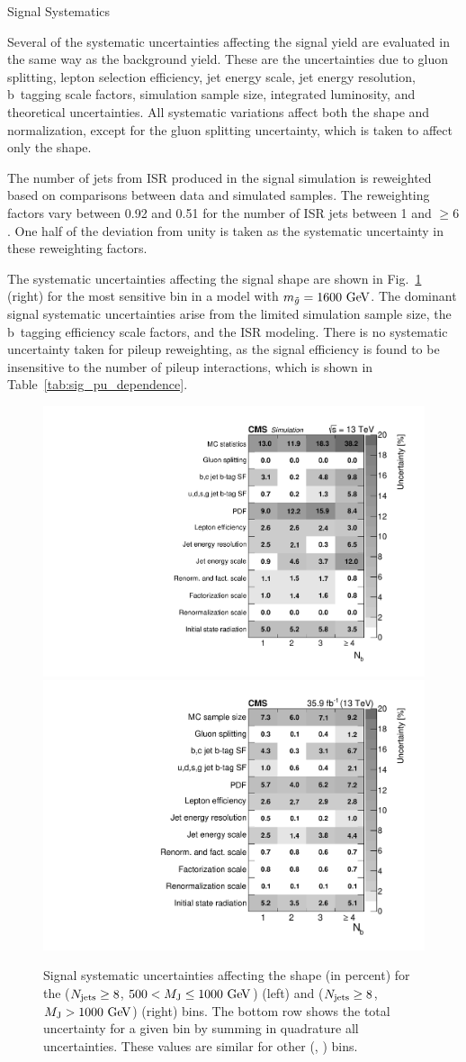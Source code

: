 \begin{section}{Signal Systematics}

Several of the systematic uncertainties affecting the signal yield are evaluated in the same way as the background yield.
These are the uncertainties due to gluon splitting, lepton selection efficiency, jet energy scale, jet energy resolution, b~tagging scale factors, simulation sample size, integrated luminosity, and theoretical uncertainties.
All systematic variations affect both the \Nb shape and normalization, except for the gluon splitting uncertainty, which is taken to affect only the \Nb shape.

The number of jets from ISR produced in the signal simulation is reweighted based on comparisons between data and simulated \ttbar samples.
The reweighting factors vary between 0.92 and 0.51 for the number of ISR jets between 1 and $\ge6$.
One half of the deviation from unity is taken as the systematic uncertainty in these reweighting factors.

The systematic uncertainties affecting the signal \Nb shape are shown in Fig.~\ref{fig:sig_sys_tables} (right) for the most sensitive bin in a model with $m_{\tilde{g}} = 1600~\mathrm{Ge\kern -0.1em V}$.
The dominant signal systematic uncertainties arise from the limited simulation sample size, the b~tagging efficiency scale factors, and the ISR modeling.
There is no systematic uncertainty taken for pileup reweighting, as the signal efficiency is found to be insensitive to the number of pileup interactions, which is shown in Table~\ref{tab:sig_pu_dependence}.

\begin{figure}[tbp!]
\begin{center}
\includegraphics[angle=0,width=0.45\columnwidth]{fig/table_sig_systs_bin20_m1600.pdf}
\includegraphics[angle=0,width=0.45\columnwidth]{fig/table_sig_systs_bin21_m1600.pdf}
\end{center}
\caption{Signal systematic uncertainties affecting the \Nb shape (in percent) for the ($N_{\mathrm{jets}} \geq 8$, $500 < M_\mathrm{J} \leq 1000~\mathrm{Ge\kern -0.1em V}$) (left) and ($N_{\mathrm{jets}} \geq 8$, $M_\mathrm{J} > 1000~\mathrm{Ge\kern -0.1em V}$) (right) bins. The bottom row shows the total uncertainty for a given \Nb bin by summing in quadrature all uncertainties. These values are similar for other (\Njets, \MJ) bins.}
\label{fig:sig_sys_tables}
\end{figure}


\end{section}
